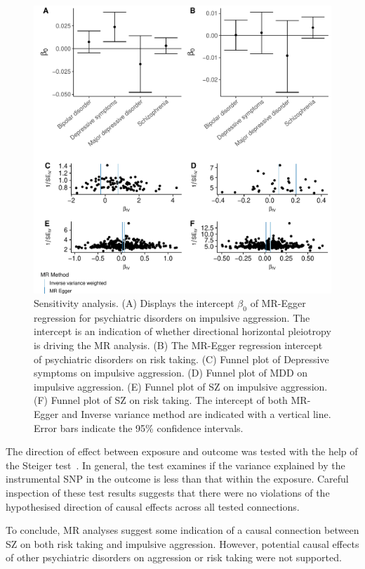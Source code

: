 \begin{figure}[htpb]
  \centering
  \includegraphics[width=0.9\linewidth]{ukb_psychiatric/figures/sensitvity_plot.pdf}
  \caption[Sensitivity Analysis]{Sensitivity analysis.
    (A) Displays the intercept $\beta_0$ of MR-Egger regression for psychiatric disorders on impulsive aggression. The intercept is an indication of whether directional horizontal pleiotropy is driving the MR analysis.
    (B) The MR-Egger regression intercept of psychiatric disorders on risk taking.
    (C) Funnel plot of Depressive symptoms on impulsive aggression. 
    (D) Funnel plot of MDD on impulsive aggression. 
    (E) Funnel plot of SZ on impulsive aggression. 
    (F) Funnel plot of SZ on risk taking. 
    The intercept of both MR-Egger and Inverse variance method are indicated with a vertical line.
    Error bars indicate the 95\% confidence intervals.
  }\label{fig:sensitivity}
\end{figure}

The  direction of effect between exposure and outcome was tested with the help of the Steiger test~\cite{Steiger1980}.
In general, the test examines if the variance explained by the  instrumental SNP in the outcome is less than that within the exposure. 
Careful inspection of these test results suggests that there were no violations of the hypothesised direction of causal effects across all tested connections.

To conclude, MR analyses suggest some indication of a causal connection between SZ on both risk taking and impulsive aggression.
However, potential causal effects of other psychiatric disorders on aggression or risk taking were not supported.
